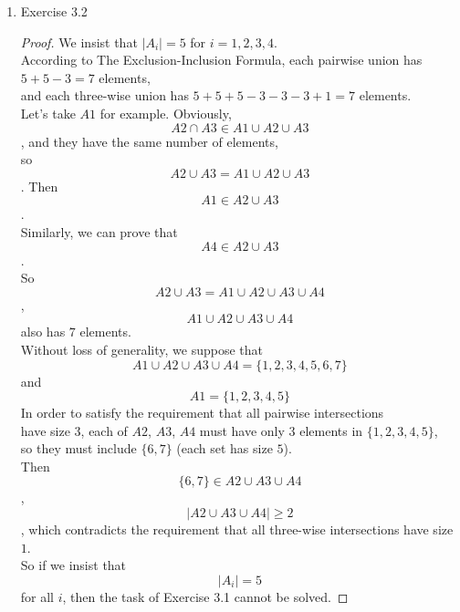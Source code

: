 \documentclass[12pt,a4paper]{article}
\theoremstyle{definition}
\begin{document}
\begin{enumerate}
		\item
		Exercise 3.2
		\begin{proof}
		We insist that $\mid A_i \mid =5$ for $i=1 ,2,3,4$.\\
		According to The Exclusion-Inclusion Formula, each pairwise union has $5+5-3=7$ elements, \\
		and each three-wise union has $5+5+5-3-3-3+1=7$ elements.\\
		Let's take $A1$ for example. Obviously, $$A2 \cap A3 \in A1 \cup A2 \cup A3$$, and they have the same number of elements,\\
		so $$A2 \cup A3 = A1 \cup A2 \cup A3$$. Then $$A1 \in A2 \cup A3$$.\\
		Similarly, we can prove that $$A4 \in A2 \cup A3$$.\\
		So $$A2 \cup A3=A1 \cup A2 \cup A3 \cup A4$$, $$A1 \cup A2 \cup A3 \cup A4$$ also has $7$ elements.\\
		Without loss of generality, we suppose that\\
		$$A1 \cup A2 \cup A3 \cup A4=\{1,2,3,4,5,6,7\}$$ and $$A1=\{1,2,3,4,5\}$$
		In order to satisfy the requirement that all pairwise intersections\\
		have size $3$, each of $A2$, $A3$, $A4$ must have only $3$ elements in $\{1,2,3,4,5\}$, \\so they must include $\{6,7\}$ (each set has size $5$).\\
		Then $$\{6,7\} \in A2 \cup A3 \cup A4$$, $$ \mid A2 \cup A3 \cup A4 \mid \ge 2$$, which contradicts the requirement that all three-wise intersections have size $1$.\\
		So if we insist that $$ \mid A_i\mid  = 5$$ for all $i$, then the task of Exercise 3.1 cannot be solved.
		\end{proof}
		
	\end{enumerate}
	
	\vspace{20pt}
	
	
	
\end{document}
